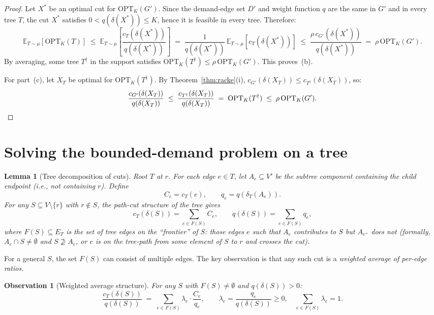 \documentclass[11pt]{article}
\newtheorem{lemma}[theorem]{Lemma}
\newtheorem{observation}[theorem]{Observation}
\newcommand{\cut}{\delta}
\newcommand{\OPT}{\mathrm{OPT}}
\newcommand{\Etree}{\mathbb{E}_{T\sim\mu}}
\begin{document}
\begin{proof}
  Let $X^*$ be an optimal cut for $\OPT_K(G')$.
  Since the demand-edge set $D'$ and weight function $q$ are the same in $G'$ and in every tree $T$,
  the cut $X^*$ satisfies $0<q(\cut(X^*))\le K$, hence it is feasible in every tree.
  Therefore:
  \[
    \Etree\!\left[\OPT_K(T)\right]
    \;\le\;
    \Etree\!\left[\frac{c_T(\cut(X^*))}{q(\cut(X^*))}\right]
    \;=\;
    \frac{1}{q(\cut(X^*))}\,\Etree\!\left[c_T(\cut(X^*))\right]
    \;\le\;
    \frac{\rho\,c_{G'}(\cut(X^*))}{q(\cut(X^*))}
    \;=\;
    \rho\,\OPT_K(G').
  \]
  By averaging, some tree $T^{\dagger}$ in the support satisfies
  $\OPT_K(T^{\dagger})\le \rho\,\OPT_K(G')$.  This proves~(b).

  For part~(c), let $X_T$ be optimal for $\OPT_K(T^{\dagger})$.
  By Theorem~\ref{thm:racke}(i), $c_{G'}(\cut(X_T))\le c_{T^{\dagger}}(\cut(X_T))$,
  so:
  \[
    \frac{c_{G'}(\cut(X_T))}{q(\cut(X_T))}
    \;\le\;
    \frac{c_{T^{\dagger}}(\cut(X_T))}{q(\cut(X_T))}
    \;=\;
    \OPT_K(T^{\dagger})
    \;\le\;
    \rho\,\OPT_K(G').
    \qedhere
  \]
\end{proof}

\section{Solving the bounded-demand problem on a tree}

\begin{lemma}[Tree decomposition of cuts]\label{lem:tree-cut}
  Root $T$ at $r$. For each edge $e\in T$, let $A_e\subseteq V'$ be the
  subtree component containing the child endpoint (i.e., not containing $r$).
  Define
  \[
    C_e = c_T(e), \qquad q_e = q(\cut_T(A_e)).
  \]
  For any $S\subseteq V\setminus\{r\}$ with $r\notin S$, the path-cut structure of the
  tree gives
  \[
    c_T(\cut(S)) = \sum_{e\in F(S)} C_e,
    \qquad
    q(\cut(S)) = \sum_{e\in F(S)} q_e,
  \]
  where $F(S)\subseteq E_T$ is the set of tree edges on the ``frontier'' of $S$:
  those edges $e$ such that $A_e$ contributes to $S$ but $A_{e^+}$ does not
  (formally, $A_e\cap S\neq\emptyset$ and $S\nsupseteq A_e$, or $e$ is on the
  tree-path from some element of $S$ to $r$ and crosses the cut).
\end{lemma}

For a general $S$, the set $F(S)$ can consist of multiple edges.
The key observation is that any such cut is a \emph{weighted average of
per-edge ratios}.

\begin{observation}[Weighted average structure]\label{obs:average}
  For any $S$ with $F(S)\neq\emptyset$ and $q(\cut(S))>0$:
  \[
    \frac{c_T(\cut(S))}{q(\cut(S))}
    \;=\;
    \sum_{e\in F(S)} \lambda_e \cdot \frac{C_e}{q_e},
    \qquad
    \lambda_e = \frac{q_e}{q(\cut(S))}\ge 0,
    \quad
    \sum_{e\in F(S)}\lambda_e = 1.
  \]
\end{observation}
\end{document}
